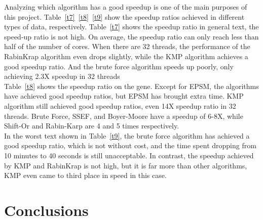 \documentclass[11pt]{article}       %
\newcommand{\includeFig}[3]      {\begin{figure}[htb] \begin{center}
                                 \includegraphics
                                 [width=4in,keepaspectratio] %
                                 {#2}\caption{\label{#1}#3} \end{center} \end{figure}}
\begin{document}
Analyzing which algorithm has a good speedup is one of the main purposes of this project. Table~\ref{t7}~\ref{t8}~\ref{t9} show the speedup ratios achieved in different types of data, respectively. Table~\ref{t7} shows the speedup ratio in general text, the speed-up ratio is not high. On average, the speedup ratio can only reach less than half of the number of cores. When there are 32 threads, the performance of the RabinKrap algorithm even drops slightly, while the KMP algorithm achieves a good speedup ratio. And the brute force algorithm speeds up poorly, only achieving 2.3X speedup in 32 threads\\ 
Table~\ref{t8} shows the speedup ratio on the gene. Except for EPSM, the algorithms have achieved good speedup ratios, but EPSM has brought extra time. KMP algorithm still achieved good speedup ratios, even 14X speedup ratio in 32 threads. Brute Force, SSEF, and Boyer-Moore have a speedup of 6-8X, while Shift-Or and Rabin-Karp are 4 and 5 times respectively.\\
In the worst text shown in Table~\ref{t9}, the brute force algorithm has achieved a good speedup ratio, which is not without cost, and the time spent dropping from 10 minutes to 40 seconds is still unacceptable. In contrast, the speedup achieved by KMP and RabinKrap is not high, but it is far more than other algorithms, KMP even came to third place in speed in this case.






\section{Conclusions} \label{concl}
\end{document}
